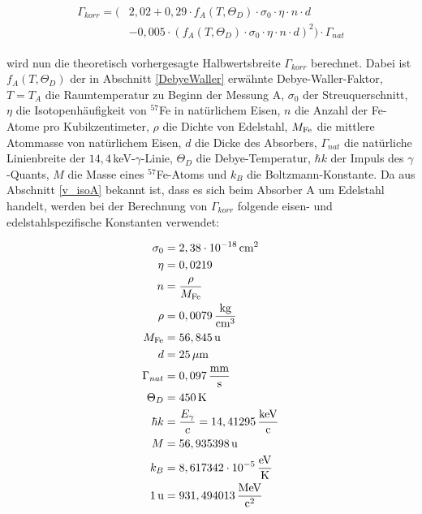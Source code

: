 \documentclass[
a4paper,                %
titlepage=firstiscover, %
captions=tableheading,  %
toc=bibliography,       %
toc=listof,             %
oneside,                %
automark,               %
12pt,                   %
english, ngerman,       %
parskip = half,         %
]{scrartcl}
\begin{document}
\begin{align}
\begin{split}
\Gamma_{korr}=\Big( &2,02+0,29\cdot f_{A}(T,\Theta_{D})\cdot\sigma_{0}\cdot\eta\cdot n\cdot d \\ %
&-0,005\cdot\left( f_{A}(T,\Theta_{D})\cdot\sigma_{0}\cdot\eta\cdot n\cdot d\right) ^2 \Big)\cdot\Gamma_{nat}
\end{split}
\end{align}

\noindent wird nun die theoretisch vorhergesagte Halbwertsbreite $\Gamma_{korr}$ berechnet.
Dabei ist $f_{A}(T,\Theta_{D})$ der in Abschnitt \ref{DebyeWaller} erwähnte Debye-Waller-Faktor, $T=T_{A}$ die Raumtemperatur zu Beginn der Messung A, $\sigma_{0}$ der Streuquerschnitt, $\eta$ die Isotopenhäufigkeit von $^{57}$Fe in natürlichem Eisen, $n$ die Anzahl der Fe-Atome pro Kubikzentimeter, $\rho$ die Dichte von Edelstahl, $M_{\textnormal{Fe}}$ die mittlere Atommasse von natürlichem Eisen, $d$ die Dicke des Absorbers, $\Gamma_{nat}$ die natürliche Linienbreite der $14,4\,$keV-$\gamma$-Linie, $\Theta_{D}$ die Debye-Temperatur, $\hbar k$ der Impuls des $\gamma$-Quants, $M$ die Masse eines $^{57}$Fe-Atoms und $k_{B}$ die Boltzmann-Konstante.
Da aus Abschnitt \ref{v_isoA} bekannt ist, dass es sich beim Absorber A um Edelstahl handelt, werden bei der Berechnung von $\Gamma_{korr}$ folgende eisen- und edelstahlspezifische Konstanten verwendet:

\begin{align*}
\sigma_{0} &= 2,38\cdot 10^{-18}\,\textnormal{cm}^2 \\
\eta &= 0,0219 \\
n &= \frac{\rho}{M_{\textnormal{Fe}}} \\
\rho &= 0,0079\,\frac{\textnormal{kg}}{\textnormal{cm}^3} \\
M_{\textnormal{Fe}} &= 56,845\,\textnormal{u} \\
d &= 25\,\mu\textnormal{m} \\
\Gamma_{nat} &= 0,097\,\frac{\textnormal{mm}}{\textnormal{s}} \\
\Theta_{D} &= 450\,\textnormal{K} \\
\hbar k &= \frac{E_{\gamma}}{c}=14,41295\,\frac{\textnormal{keV}}{\textnormal{c}} \\
M &= 56,935398\,\textnormal{u} \\
k_{B} &= 8,617342\cdot 10^{-5}\,\frac{\textnormal{eV}}{\textnormal{K}} \\
1\,\textnormal{u} &= 931,494013\,\frac{\textnormal{MeV}}{\textnormal{c}^2}
\end{align*}
\end{document}
